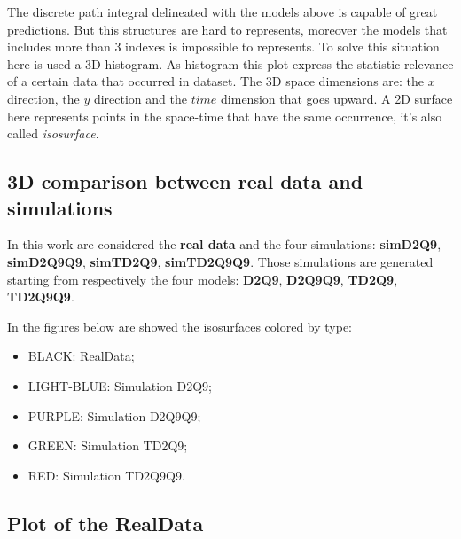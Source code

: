 \documentclass[class=article, crop=false]{standalone}
\begin{document}
The discrete path integral delineated with the models above is capable of great predictions.
But this structures are hard to represents, moreover the models that includes more than 3 indexes is impossible to represents.
To solve this situation here is used a 3D-histogram.
As histogram this plot express the statistic relevance of a certain data that occurred in dataset.
The 3D space dimensions are: the $x$ direction, the $y$ direction and the $time$ dimension that goes upward.
A 2D surface here represents points in the space-time that have the same occurrence, it's also called \emph{isosurface}.

\subsection{3D comparison between real data and simulations}
In this work are considered the \textbf{real data} and the four simulations: \textbf{simD2Q9}, \textbf{simD2Q9Q9}, \textbf{simTD2Q9}, \textbf{simTD2Q9Q9}.
Those simulations are generated starting from respectively the four models: \textbf{D2Q9}, \textbf{D2Q9Q9}, \textbf{TD2Q9}, \textbf{TD2Q9Q9}.

In the figures below are showed the isosurfaces colored by type:
\begin{itemize}
\item BLACK: RealData;
\item LIGHT-BLUE: Simulation D2Q9;
\item PURPLE: Simulation D2Q9Q9;
\item GREEN: Simulation TD2Q9;
\item RED: Simulation TD2Q9Q9.
\end{itemize}

\newpage

\FloatBarrier
\subsection{Plot of the RealData}
\end{document}
